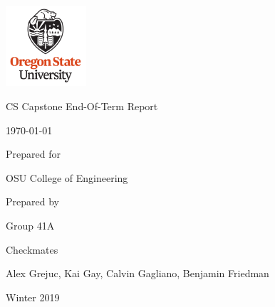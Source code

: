 \documentclass[onecolumn, draftclsnofoot,10pt, compsoc]{IEEEtran}
\def \CapstoneTeamName{		Checkmates}
\def \CapstoneTeamNumber{		41A}
\def \CapstoneProjectName{		}
\def \CapstoneSponsorCompany{	OSU College of Engineering}
\def \DocType{End-Of-Term Report}
\begin{document}
\begin{titlepage}
    \begin{center}
    	\includegraphics[height=3cm]{img/osu.png}
    \end{center}
    \begin{singlespace}
        \hfill 
        \par\vspace{.2in}
        \centering
        \scshape{
            \huge CS Capstone \DocType \par
            {\large\today}\par
            \textbf{\Huge\CapstoneProjectName}\par
            {\large Prepared for}\par
            \Huge \CapstoneSponsorCompany\par
            \vspace{5pt}
            {\large Prepared by }\par
            \vspace{5pt}
            {\Large    
                Group\CapstoneTeamNumber\par
                \CapstoneTeamName\par
                \vspace{14pt}
            {\Large
                Alex Grejuc, Kai Gay, Calvin Gagliano, Benjamin Friedman
            }\par
            {\Large Winter 2019}\par
            \vspace{20pt}
            }
        }
        \begin{abstract}

\end{abstract}
\end{singlespace}
\end{titlepage}
\end{document}
